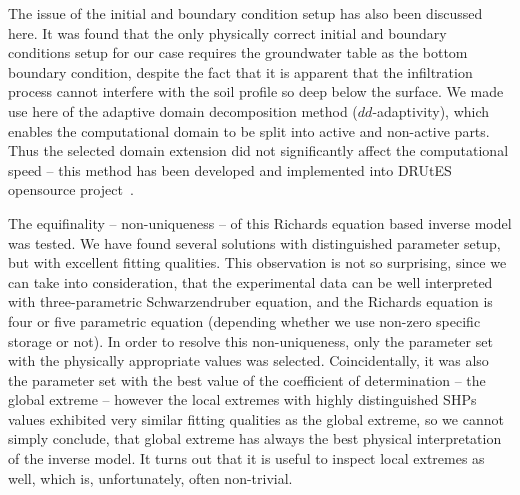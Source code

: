 \documentclass[review]{myarticle}
\begin{document}
The issue of the initial and boundary condition setup has also been discussed here. It was found  that the only physically correct  initial and boundary conditions setup for our  case requires the groundwater table as the bottom boundary condition, despite the fact that it is apparent that the infiltration process cannot interfere with the soil profile so deep below the surface.  We made use here of the adaptive domain decomposition method ($dd$-adaptivity), which enables the computational domain to be split into active and non-active parts. Thus the selected domain extension did not significantly affect the computational speed -- this method has been developed and implemented into DRUtES opensource project~\citep{drutes}.

The equifinality -- non-uniqueness --  of this Richards equation based inverse model was tested. We have found several solutions with distinguished parameter setup, but with excellent fitting qualities. This observation is not so surprising,  since we can take into consideration, that the experimental data can be well interpreted with three-parametric Schwarzendruber equation, and the Richards equation is four or five parametric equation (depending whether we use non-zero specific storage or not). In order to resolve this non-uniqueness, only the parameter set with the physically appropriate values was selected. Coincidentally, it was also the parameter set with the best value of the coefficient of determination -- the global extreme -- however the local extremes with highly distinguished SHPs values exhibited very similar fitting qualities as the global extreme, so we cannot simply conclude, that global extreme has always the best physical interpretation of the inverse model. It turns out that it is useful to inspect local extremes as well, which is, unfortunately,  often non-trivial.



% 
\end{document}
